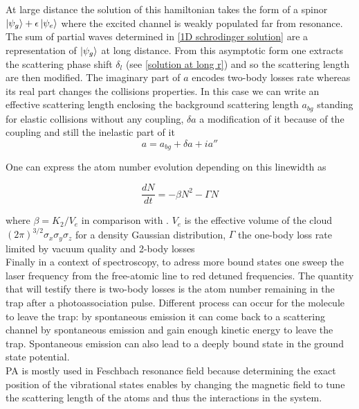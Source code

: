 At large distance the solution of this hamiltonian takes the form of a spinor $\ket{\psi_g} + \epsilon \ket{\psi_e}$
where the excited channel is weakly populated far from resonance. The sum of partial waves determined in \ref{1D schrodinger solution} 
are a representation of $\ket{\psi _g}$ at long distance.
From this asymptotic form one extracts the scattering phase shift $\delta_l$ (see \ref{solution at long r}) and so the scattering length are then modified.
The imaginary part of $a$ encodes two-body losses rate whereas its real part changes the collisions properties. In this 
case we can write an effective scattering length enclosing the background scattering
length $a_{bg}$ standing for elastic collisions without any coupling, $\delta a$ a
modification of it because of the coupling and still the inelastic part of it
\begin{equation}
    a = a_{bg} + \delta a + ia''
\end{equation}

One can express the atom number evolution depending on this linewidth as

\begin{equation}
    \frac{dN}{dt} = - \beta N^2- \Gamma N
    \label{equation one and two-body losses}
\end{equation}

where $\beta = K_2/V_e$ in comparison with \cite{han_photoassociation_2018}. $V_e$ is the effective volume of the cloud $(2\pi )^{3/2}\sigma_x 
\sigma_y \sigma_z$ for a density Gaussian distribution, $\Gamma$ 
the one-body loss rate limited by vacuum quality and 2-body losses\\


Finally in a context of spectroscopy, to adress more bound states
one sweep the laser frequency from the free-atomic line to red detuned frequencies. 
The quantity that will testify there is two-body losses
is the atom number remaining in the trap after a photoassociation pulse. 
Different process can occur for the molecule to leave the trap: by spontaneous emission
it can come back to a scattering channel by spontaneous emission and gain enough kinetic 
energy to leave the trap. Spontaneous emission can also lead to a deeply bound state in
the ground state potential.\\

PA is mostly used in Feschbach resonance field because determining the exact 
position of the vibrational states enables by changing the magnetic field
to tune the scattering length of the atoms and thus the interactions in the system.

